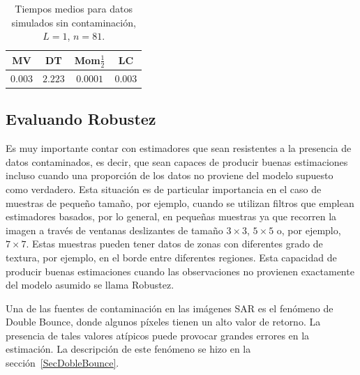 \begin{table}[htb]
	\centering
	\begin{tabular}{cccc}
		\toprule
		MV& DT& Mom$\frac{1}{2}$ & LC \\
		\midrule
		$0.003$& $2.223$ & $0.0001$ &$0.003$ \\
		\bottomrule
	\end{tabular}
\caption{\label{tablaDeTiemposmedios}\small Tiempos medios para datos simulados sin contaminación, $L=1$, $n=81$. }
\end{table}

\subsection{Evaluando Robustez}

Es muy importante contar con estimadores que sean resistentes a la presencia de datos contaminados, es decir, que sean capaces de producir buenas estimaciones incluso cuando una proporción de los datos no proviene del modelo supuesto como verdadero. Esta situación es de particular importancia en el caso de muestras de pequeño tamaño, por ejemplo, cuando se utilizan filtros que emplean estimadores basados, por lo general, en pequeñas muestras ya que recorren la imagen a través de ventanas deslizantes de tamaño $3 \times 3$, $5 \times 5$ o, por ejemplo, $7 \times 7$. Estas muestras pueden tener datos de zonas con diferentes grado de textura, por ejemplo, en el borde entre diferentes regiones. Esta capacidad de producir buenas estimaciones cuando las observaciones no provienen exactamente del modelo asumido se llama Robustez.

Una de las fuentes de contaminación en las imágenes SAR es el fenómeno de Double Bounce, donde algunos píxeles tienen un alto valor de retorno.  La presencia de tales valores atípicos puede provocar grandes errores en la estimación. La descripción de este fenómeno se hizo en la sección~\ref{SecDobleBounce}.

